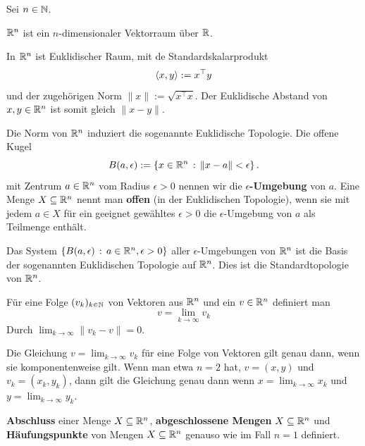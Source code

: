 \begin{bem} Sei $n \in \mathbb{N}$.   
	\begin{enuma}
		\item $\mathbb{R}^n$ ist ein $n$-dimensionaler Vektorraum über $\mathbb{R}$. 
		\item In $\mathbb{R}^n$ ist Euklidischer Raum, mit de Standardskalarprodukt 
		\[
			\left< x , y \right> := x^\top y
		\]	
		und der zugehörigen Norm $\|x\|:= \sqrt{ x^\top x}$. Der Euklidische Abstand von $x, y \in \mathbb{R}^n$ ist somit gleich $\|x-y\|$. 
		\item Die Norm von $\mathbb{R}^n$ induziert die sogenannte Euklidische Topologie. Die offene Kugel
		\[
			B(a,\epsilon) := \left\{ x \in \mathbb{R}^n \,:\, \|x-a\| < \epsilon \right\}. 
		\] 
		mit Zentrum $a \in \mathbb{R}^n$ vom Radius $\epsilon> 0$ nennen wir die \textbf{$\epsilon$-Umgebung} von $a$. Eine Menge $X \subseteq \mathbb{R}^n$ nennt man \textbf{offen} (in der Euklidischen Topologie), wenn sie mit jedem $a \in X$ für ein geeignet gewähltes $\epsilon>0$ die $\epsilon$-Umgebung von $a$ als Teilmenge enthält. 
	\end{enuma} 
\end{bem} 

\begin{bem}
	Das System $\left\{  B(a,\epsilon)  \,:\, a \in \mathbb{R}^n, \epsilon > 0 \right\}$ aller $\epsilon$-Umgebungen von $\mathbb{R}^n$ ist die Basis der sogenannten Euklidischen Topologie auf $\mathbb{R}^n$. Dies ist die Standardtopologie von $\mathbb{R}^n$. 
\end{bem} 

\begin{defn}
	Für eine Folge  $(v_k)_{k \in \mathbb{N}}$ von Vektoren aus $\mathbb{R}^n$ und ein $v \in \mathbb{R}^n$ definiert man 
	\[
		v = \lim_{k \to \infty} v_k
	\]
	Durch $\lim_{k \to \infty} \|v_k - v\| =0$. 
\end{defn} 

\begin{bem}
		Die Gleichung $v = \lim_{k \to \infty} v_k$ für eine Folge von Vektoren gilt genau dann, wenn sie komponentenweise gilt. Wenn man etwa $n=2$ hat, $ v= (x,y)$ und $v_k = (x_k,y_k)$, dann gilt die Gleichung genau dann wenn $x = \lim_{k \to \infty} x_k$ und $y = \lim_{k \to \infty} y_k$. 
\end{bem} 

\begin{defn} 
	\textbf{Abschluss} einer Menge $X \subseteq \mathbb{R}^n$, \textbf{abgeschlossene Mengen} $X \subseteq \mathbb{R}^n$ und \textbf{Häufungspunkte} von Mengen $X \subseteq \mathbb{R}^n$ genauso wie im Fall $n=1$ definiert.
\end{defn} 

